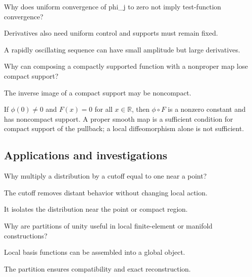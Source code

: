 \begin{exercise}\label{exr:iii15-expand-11}
Why does uniform convergence of phi\_j to zero not imply test-function convergence?
\end{exercise}
\begin{hint}
Derivatives also need uniform control and supports must remain fixed.
\end{hint}
\begin{solution}
A rapidly oscillating sequence can have small amplitude but large derivatives.
\end{solution}

\begin{exercise}\label{exr:iii15-expand-12}
Why can composing a compactly supported function with a nonproper map lose compact support?
\end{exercise}
\begin{hint}
The inverse image of a compact support may be noncompact.
\end{hint}
\begin{solution}
If $\phi(0)\ne0$ and $F(x)=0$ for all $x\in\mathbb R$, then $\phi\circ F$ is a nonzero constant and has noncompact support. A proper smooth map is a sufficient condition for compact support of the pullback; a local diffeomorphism alone is not sufficient.
\end{solution}

\subsection*{Applications and investigations}

\begin{exercise}[Localization]\label{exr:iii15-expand-13}
Why multiply a distribution by a cutoff equal to one near a point?
\end{exercise}
\begin{hint}
The cutoff removes distant behavior without changing local action.
\end{hint}
\begin{solution}
It isolates the distribution near the point or compact region.
\end{solution}

\begin{exercise}\label{exr:iii15-expand-14}
Why are partitions of unity useful in local finite-element or manifold constructions?
\end{exercise}
\begin{hint}
Local basis functions can be assembled into a global object.
\end{hint}
\begin{solution}
The partition ensures compatibility and exact reconstruction.
\end{solution}

